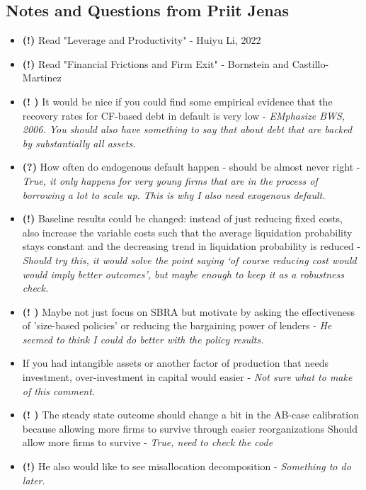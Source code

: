 \documentclass[12pt]{article}
\begin{document}
\subsection*{Notes and Questions from Priit Jenas}
\begin{itemize}
    \item \textbf{(!)} Read "Leverage and Productivity" - Huiyu Li, 2022
    \item \textbf{(!)} Read "Financial Frictions and Firm Exit" - Bornstein and Castillo-Martinez
    \item \textbf{(! \checkmark)} It would be nice if you could find some empirical evidence that the recovery rates for CF-based debt in default is very low - \textit{EMphasize BWS, 2006. You should also have something to say that about debt that are backed by substantially all assets.}
    \item \textbf{(?)} How often do endogenous default happen - should be almost never right -\textit{True, it only happens for very young firms that are in the process of borrowing a lot to scale up. This is why I also need exogenous default.}
    \item \textbf{(!)} Baseline results could be changed: instead of just reducing fixed costs, also increase the variable costs such that the average liquidation probability stays constant and the decreasing trend in liquidation probability is reduced - \textit{Should try this, it would solve the point saying `of course reducing cost would would imply better outcomes', but maybe enough to keep it as a robustness check.}
    \item \textbf{(! \checkmark)} Maybe not just focus on SBRA but motivate by asking the effectiveness of 'size-based policies' or reducing the bargaining power of lenders - \textit{He seemed to think I could do better with the policy results.}
    \item If you had intangible assets or another factor of production that needs investment, over-investment in capital would easier - \textit{Not sure what to make of this comment.} 
    \item \textbf{(! \checkmark)} The steady state outcome should change a bit in the AB-case calibration because allowing more firms to survive through easier reorganizations Should allow more firms to survive - \textit{True, need to check the code} 
    \item \textbf{(!)} He also would like to see misallocation decomposition - \textit{Something to do later.}
\end{itemize}
\end{document}
